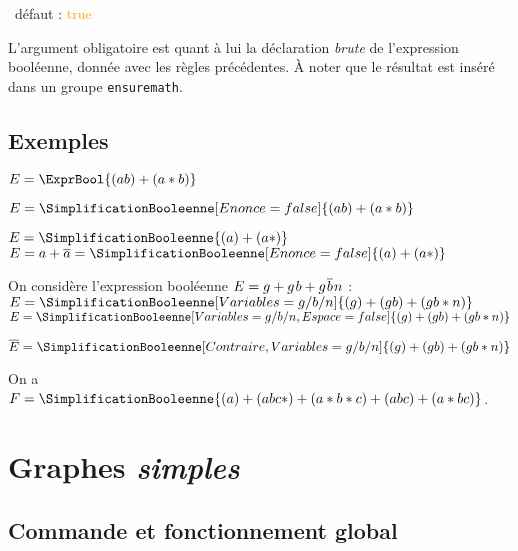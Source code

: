 \documentclass[french,a4paper,11pt]{article}
\newcommand\Cle[1]{{\small\sffamily\textlangle \textcolor{orange}{#1}\textrangle}}
\begin{document}
{{\begin{tipblock}
\begin{itemize}
	\hfill~défaut : \Cle{true}
\end{itemize}

L'argument obligatoire est quant à lui la déclaration \textit{brute} de l'expression booléenne, donnée avec les règles précédentes. À noter que le résultat est inséré dans un groupe \texttt{ensuremath}.
\end{tipblock}

\subsection{Exemples}

\begin{DemoCode}
$E = \ExprBool{(ab)+(a*b)}$

$E = \SimplificationBooleenne[Enonce=false]{(ab)+(a*b)}$
\end{DemoCode}

\begin{DemoCode}
$E = \SimplificationBooleenne{(a)+(a*)}$\\
$E = a + \overline{a} = \SimplificationBooleenne[Enonce=false]{(a)+(a*)}$
\end{DemoCode}

\begin{DemoCode}
On considère l'expression booléenne $E= g + g\mkern1.5mu\relax b + g\mkern1.5mu\relax\overline{b}\mkern1.5mu\relax n$ :\\
$E = \SimplificationBooleenne[Variables=g/b/n]{(g)+(gb)+(gb*n)}$\\
$E = \SimplificationBooleenne[Variables=g/b/n,Espace=false]{(g)+(gb)+(gb*n)}$
\end{DemoCode}

\begin{DemoCode}
$\overline{E} = \SimplificationBooleenne[Contraire,Variables=g/b/n]{(g)+(gb)+(gb*n)}$
\end{DemoCode}

\begin{DemoCode}
On a $F = \SimplificationBooleenne{(a)+(abc*)+(a*b*c)+(abc)+(a*bc)}$.
\end{DemoCode}

\pagebreak

\section{Graphes \textit{simples}}

\subsection{Commande et fonctionnement global}

}}
\end{document}
